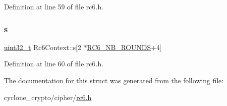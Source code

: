 Definition at line 59 of file rc6.\+h.

\mbox{\label{structRc6Context_a984b8519b232e9041568d2ccaef2f451}} 
\subsubsection{\texorpdfstring{s}{s}}
{\footnotesize\ttfamily \hyperlink{stdint_8h_a435d1572bf3f880d55459d9805097f62}{uint32\+\_\+t} Rc6\+Context\+::s\mbox{[}2 $\ast$\hyperlink{rc6_8h_a36bcca60e56650daa3b834e6d37b73bc}{R\+C6\+\_\+\+N\+B\+\_\+\+R\+O\+U\+N\+DS}+4\mbox{]}}



Definition at line 60 of file rc6.\+h.



The documentation for this struct was generated from the following file\+:\begin{DoxyCompactItemize}
\item 
cyclone\+\_\+crypto/cipher/\hyperlink{rc6_8h}{rc6.\+h}\end{DoxyCompactItemize}

